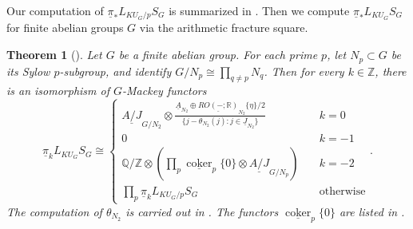 \documentclass{amsart}
\theoremstyle{plain}
\newtheorem{theorem}{Theorem}[section]
\theoremstyle{definition}
\theoremstyle{remark}
\begin{document}
    Our computation of $\underline{\pi}_* L_{KU_G/p}S_G$ is summarized in . Then we compute $\underline{\pi}_\ast L_{KU_G}S_G$ for finite abelian groups $G$ via the arithmetic fracture square. 

    \begin{theorem}[]\label{IntroThm:integer graded homotopy Mackey functor of ku local sphere}
	Let $G$ be a finite abelian group. For each prime $p$, let $N_p\subset G$ be its Sylow $p$-subgroup, and identify $G/N_p \cong \prod_{q\neq p}N_q$. Then for every $k\in \mathbb Z$, there is an isomorphism of $G$-Mackey functors
    \[
	\underline{\pi}_kL_{KU_G}S_G\cong \begin{cases}
		\underline{A/J}_{G/N_2} \otimes  \frac{\underline{A}_{N_2} \oplus \underline{RO(-;\mathbb{R})}_{N_2}\{\eta\}/2}{\{j-\theta_{N_2}(j):j\in \underline{J}_{N_2}\}} & \quad k=0\\
		0 & \quad k=-1\\
		\mathbb{Q}/\mathbb{Z}\otimes (\prod_p \underline{\operatorname{coker}}_p\{0\}\otimes \underline{A/J}_{G/N_p}) & \quad k=-2\\
		\prod_p \underline{\pi}_kL_{KU_G/p}S_G & \quad \text{otherwise}
	\end{cases}.
	\]
    The computation of $\theta_{N_2}$ is carried out in .
    The functors $\underline{\operatorname{coker}}_p\{0\}$ are listed in .
    \end{theorem}
\end{document}
